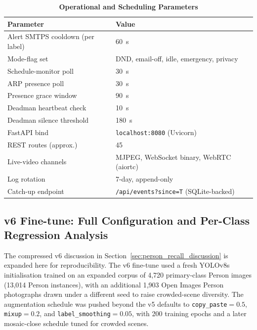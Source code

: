 \documentclass{ieeeaccess}
\begin{document}
\begin{table}[ht!]
\caption{\textbf{Operational and Scheduling Parameters}}
\label{tab:operational_params}
\setlength{\tabcolsep}{3pt}
\centering\footnotesize
\begin{tabular}{|l|p{4.0cm}|}
\hline
\textbf{Parameter} & \textbf{Value} \\
\hline
Alert SMTPS cooldown (per label) & 60~s \\
Mode-flag set & DND, email-off, idle, emergency, privacy \\
Schedule-monitor poll & 30~s \\
ARP presence poll & 30~s \\
Presence grace window & 90~s \\
Deadman heartbeat check & 10~s \\
Deadman silence threshold & 180~s \\
FastAPI bind & \texttt{localhost:8080} (Uvicorn) \\
REST routes (approx.) & 45 \\
Live-video channels & MJPEG, WebSocket binary, WebRTC (aiortc) \\
Log rotation & 7-day, append-only \\
Catch-up endpoint & \texttt{/api/events?since=T} (SQLite-backed) \\
\hline
\end{tabular}
\end{table}


\subsection{v6 Fine-tune: Full Configuration and Per-Class Regression Analysis}
\label{sec:v6_details}
The compressed v6 discussion in Section~\ref{sec:person_recall_discussion} is expanded here for reproducibility. The v6 fine-tune used a fresh YOLOv8s initialisation trained on an expanded corpus of 4{,}720 primary-class Person images (13{,}014 Person instances), with an additional 1{,}903 Open Images Person photographs drawn under a different seed to raise crowded-scene diversity. The augmentation schedule was pushed beyond the v5 defaults to \texttt{copy\_paste}$=0.5$, \texttt{mixup}$=0.2$, and \texttt{label\_smoothing}$=0.05$, with 200 training epochs and a later mosaic-close schedule tuned for crowded scenes.
\end{document}
